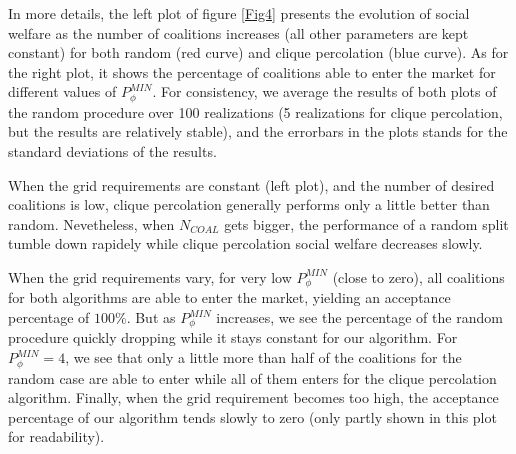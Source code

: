 \documentclass[conference]{IEEEtran}
\begin{document}
In more details, the left plot of figure \ref{Fig4} presents the evolution of social welfare as the number of coalitions increases (all other parameters are kept constant) for both random (red curve) and clique percolation (blue curve). As for the right plot, it shows the percentage of coalitions able to enter the market for different values of $ P_{\phi}^{MIN} $. For consistency, we average the results of both plots of the random procedure over 100 realizations (5 realizations for clique percolation, but the results are relatively stable), and the errorbars in the plots stands for the standard deviations of the results.

When the grid requirements are constant (left plot), and the number of desired coalitions is low, clique percolation generally performs only a little better than random. Nevetheless, when $ N_{COAL} $ gets bigger, the performance of a random split tumble down rapidely while clique percolation social welfare decreases slowly.

When the grid requirements vary, for very low $ P_{\phi}^{MIN} $ (close to zero), all coalitions for both algorithms are able to enter the market, yielding an acceptance percentage of $ 100 \% $. But as $ P_{\phi}^{MIN} $ increases, we see the percentage of the random procedure quickly dropping while it stays constant for our algorithm. For $ P_{\phi}^{MIN} = 4 $, we see that only a little more than half of the coalitions for the random case are able to enter while all of them enters for the clique percolation algorithm. Finally, when the grid requirement becomes too high, the acceptance percentage of our algorithm tends slowly to zero (only partly shown in this plot for readability).
\end{document}
